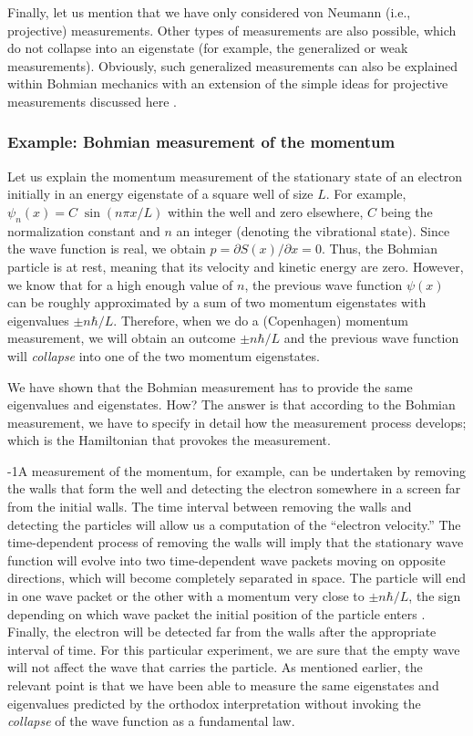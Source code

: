 \documentclass[nofootinbib, secnumarabic, amsmath, nobibnotes,11pt,aps,pra, floatfix]{revtex4-1}
\begin{document}
Finally, let us mention that we have only considered von Neumann
(i.e., projective) measurements. Other types of measurements are
also possible, which do not collapse into an eigenstate (for example, the generalized or  weak measurements). Obviously, such generalized measurements can also be explained within Bohmian mechanics with an extension of the simple ideas for projective measurements discussed here
\cite{om.bomhhiley1993,om.Durrnaive,om.Durrllibre}.

\subsubsection{Example: Bohmian measurement of the momentum}
\label{om.measure_moment}

Let us explain the momentum measurement of the stationary state of
an electron initially in an energy eigenstate of a square well of
size $L$. For example, $\psi_n(x) = C \; \sin(n \pi x/L)$ within the
well and zero elsewhere, $C$ being the normalization constant and
$n$ an integer (denoting the vibrational state). Since the wave
function is real, we obtain $p = \partial S(x)/\partial x = 0$.
Thus, the Bohmian particle is at rest, meaning that its velocity and
kinetic energy are zero. However, we know that for a high enough
value of $n$, the previous wave function $\psi(x)$ can be roughly
approximated by a sum of two momentum eigenstates with eigenvalues
$\pm n \hbar/L$. Therefore, when we do a (Copenhagen) momentum
measurement, we will obtain an outcome $\pm n \hbar/L$ and the
previous wave function will \textit{collapse} into one of the two
momentum eigenstates.

We have shown that the Bohmian measurement has to provide the same
eigenvalues and eigenstates. How? The answer is that according to
the Bohmian measurement, we have to specify in detail how the
measurement process develops; which is the Hamiltonian that provokes the measurement.

\looseness-1A measurement of the momentum, for example, can be undertaken by
removing the walls that form the well and detecting the electron
somewhere in a screen far from the initial walls. The time interval
between removing the walls and detecting the particles will allow us
a computation of the ``electron velocity.'' The time-dependent
process of removing the walls will imply that the stationary wave
function will evolve into two time-dependent wave packets moving on
opposite directions, which will become completely separated in
space. The particle will end in one wave packet or the other with a
momentum very close to $\pm n \hbar/L$, the sign depending on which
wave packet the initial position of the particle enters
\cite{om.bohm1952b}. Finally, the electron will be detected far from
the walls after the appropriate interval of time. For this
particular experiment, we are sure that the empty wave will not
affect the wave that carries the particle. As mentioned earlier, the
relevant point is that we have been able to measure the same
eigenstates and eigenvalues predicted by the orthodox interpretation
without invoking the \textit{collapse} of the wave function as a fundamental law.
\end{document}
